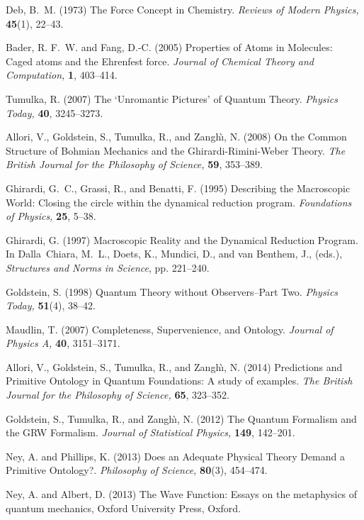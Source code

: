 \documentclass[onecolumn,secnumarabic,amsmath,amssymb,balancelastpage,nofootinbib]{article}
\begin{document}
\begin{thebibliography}{100}
Deb, B.~M. (1973)
The Force Concept in Chemistry.
{\em Reviews of Modern Physics,} {\bf 45}(1), 22--43.

Bader, R. F.~W. and Fang, D.-C. (2005)
Properties of Atoms in Molecules: Caged atoms and the Ehrenfest force.
{\em Journal of Chemical Theory and Computation,} {\bf 1}, 403--414.

Tumulka, R. (2007)
The `Unromantic Pictures' of Quantum Theory.
{\em Physics Today,} {\bf 40}, 3245--3273.

Allori, V., Goldstein, S., Tumulka, R., and Zangh\`{\i}, N. (2008)
On the Common Structure of Bohmian Mechanics and the Ghirardi-Rimini-Weber
  Theory.
{\em The British Journal for the Philosophy of Science,} {\bf 59}, 353--389.

Ghirardi, G.~C., Grassi, R., and Benatti, F. (1995)
Describing the Macroscopic World: Closing the circle within the dynamical
  reduction program.
{\em Foundations of Physics,} {\bf 25}, 5--38.

Ghirardi, G. (1997)
Macroscopic Reality and the Dynamical Reduction Program.
In Dalla~Chiara, M.~L., Doets, K., Mundici, D., and van Benthem, J., (eds.),
  \emph{Structures and Norms in Science},  pp. 221--240.

Goldstein, S. (1998)
Quantum Theory without Observers--Part Two.
{\em Physics Today,} {\bf 51}(4), 38--42.

Maudlin, T. (2007)
Completeness, Supervenience, and Ontology.
{\em Journal of Physics A,} {\bf 40}, 3151--3171.

Allori, V., Goldstein, S., Tumulka, R., and Zangh\`{\i}, N. (2014)
Predictions and Primitive Ontology in Quantum Foundations: A study of examples.
{\em The British Journal for the Philosophy of Science,} {\bf 65}, 323--352.

Goldstein, S., Tumulka, R., and Zangh\`{\i}, N. (2012)
The Quantum Formalism and the GRW Formalism.
{\em Journal of Statistical Physics,} {\bf 149}, 142--201.

Ney, A. and Phillips, K. (2013)
Does an Adequate Physical Theory Demand a Primitive Ontology?.
{\em Philosophy of Science,} {\bf 80}(3), 454--474.

Ney, A. and Albert, D. (2013)
The Wave Function: Essays on the metaphysics of quantum mechanics,
Oxford University Press, Oxford.


\end{thebibliography}
\end{document}
